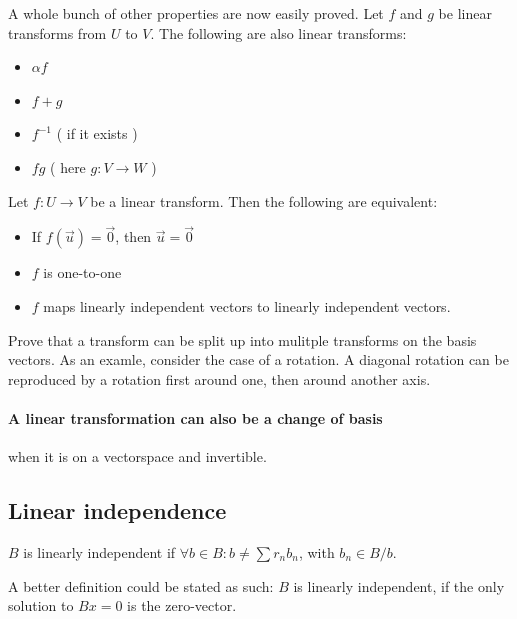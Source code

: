 A whole bunch of other properties are now easily proved. Let $f$ and $g$ be linear transforms from $U$ to $V$. The following are also linear transforms: 
\begin{itemize}
    \item $\alpha f$
    \item $f + g$
    \item $f^{-1}$ ( if it exists )
    \item $fg$ ( here $g: V \to W$ )
\end{itemize}

Let $f: U \to V$ be a linear transform. Then the following are equivalent: 
\begin{itemize}
    \item If $f(\vec{u}) = \vec{0}$, then $\vec{u} = \vec{0}$
    \item $f$ is one-to-one
    \item $f$ maps linearly independent vectors to linearly independent vectors. 
\end{itemize}


Prove that a transform can be split up into mulitple transforms on the basis vectors. 
As an examle, consider the case of a rotation. A diagonal rotation can be reproduced by a rotation first around one, then around another axis. 


\paragraph{A linear transformation can also be a change of basis} when it is on a vectorspace and invertible.














\subsection{Linear independence}


\begin{definition}
    $B$ is linearly independent if $\forall b \in B: b \neq \sum r_n b_n$, with $b_n \in B/b$. 
\end{definition}

\begin{theorem} \label{lin_indep_if_no_bx0}
  A better definition could be stated as such: $B$ is linearly independent, if the only solution to $Bx = 0$ is the zero-vector.
\end{theorem}

